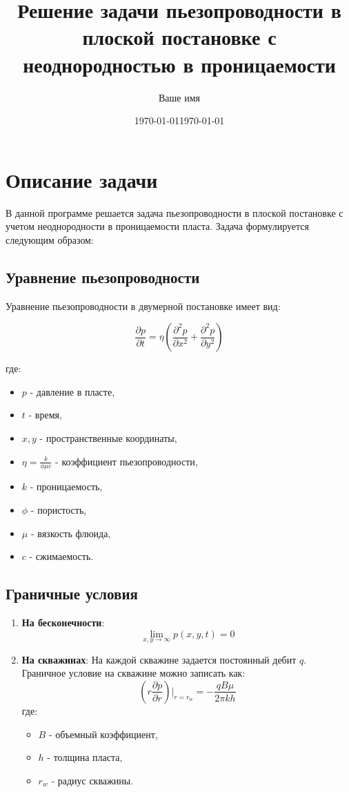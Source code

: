 \documentclass{article}
\date{\today}
\title{Решение задачи пьезопроводности в плоской постановке с неоднородностью в проницаемости}
\author{Ваше имя}
\date{\today}
\begin{document}
\maketitle

\section{Описание задачи}

В данной программе решается задача пьезопроводности в плоской постановке с учетом неоднородности в проницаемости пласта. Задача формулируется следующим образом:

\subsection{Уравнение пьезопроводности}

Уравнение пьезопроводности в двумерной постановке имеет вид:

\[
\frac{\partial p}{\partial t} = \eta \left( \frac{\partial^2 p}{\partial x^2} + \frac{\partial^2 p}{\partial y^2} \right)
\]

где:
\begin{itemize}
    \item \( p \) - давление в пласте,
    \item \( t \) - время,
    \item \( x, y \) - пространственные координаты,
    \item \( \eta = \frac{k}{\phi \mu c} \) - коэффициент пьезопроводности,
    \item \( k \) - проницаемость,
    \item \( \phi \) - пористость,
    \item \( \mu \) - вязкость флюида,
    \item \( c \) - сжимаемость.
\end{itemize}

\subsection{Граничные условия}

\begin{enumerate}
    \item \textbf{На бесконечности}:
    \[
    \lim_{x, y \to \infty} p(x, y, t) = 0
    \]

    \item \textbf{На скважинах}:
    На каждой скважине задается постоянный дебит \( q \). Граничное условие на скважине можно записать как:
    \[
    \left( r \frac{\partial p}{\partial r} \right) \bigg|_{r = r_w} = - \frac{qB\mu}{2\pi k h}
    \]
    где:
    \begin{itemize}
        \item \( B \) - объемный коэффициент,
        \item \( h \) - толщина пласта,
        \item \( r_w \) - радиус скважины.
    \end{itemize}
\end{enumerate}
\end{document}
